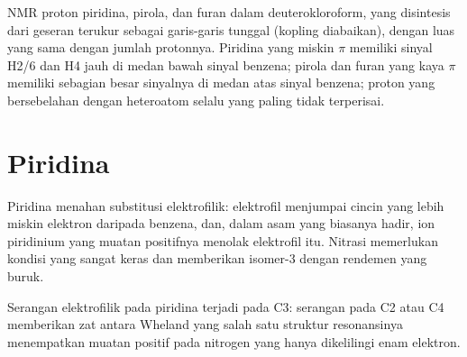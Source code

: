 \begin{omfigure}

{\small NMR proton piridina, pirola, dan furan dalam deuterokloroform,
yang disintesis dari geseran terukur sebagai garis-garis tunggal (kopling diabaikan), dengan
luas yang sama dengan jumlah protonnya. Piridina yang miskin $\pi$ memiliki sinyal H2/6 dan H4
jauh di medan bawah sinyal benzena; pirola dan furan yang kaya $\pi$ memiliki sebagian besar
sinyalnya di medan atas sinyal benzena; proton yang bersebelahan dengan heteroatom selalu yang paling
tidak terperisai.}
\end{omfigure}

\section{Piridina}

Piridina menahan substitusi elektrofilik: elektrofil menjumpai cincin yang
lebih miskin elektron daripada benzena, dan, dalam asam yang biasanya hadir, ion
piridinium yang muatan positifnya menolak elektrofil itu. Nitrasi memerlukan kondisi
yang sangat keras dan memberikan isomer-3 dengan rendemen yang buruk.

\begin{proposition}\label{prop:b3:heterocycles:pyridine-c3}
Serangan elektrofilik pada piridina terjadi pada C3: serangan pada C2 atau C4 memberikan
zat antara Wheland yang salah satu struktur resonansinya menempatkan muatan
positif pada nitrogen yang hanya dikelilingi enam elektron.
\end{proposition}

